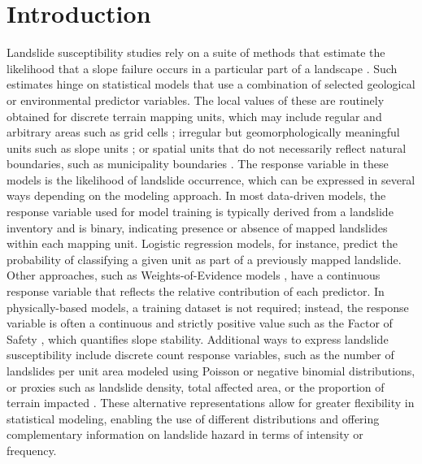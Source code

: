 \documentclass[lineno,pdflatex,sn-basic]{sn-jnl}%
\theoremstyle{thmstyleone}%
\theoremstyle{thmstyletwo}%
\theoremstyle{thmstylethree}%
\begin{document}


\maketitle

\section{Introduction}\label{intro}

Landslide susceptibility studies rely on a suite of methods that estimate the likelihood that a slope failure occurs in a particular part of a landscape \citep{brabb1984innovative, corominas2014recommendations, fell2008guidelines}. 
Such estimates hinge on statistical models that use a combination of selected geological or environmental predictor variables. 
The local values of these are routinely obtained for discrete terrain mapping units, which may include regular and arbitrary areas such as grid cells \citep{ba2018comparison}; irregular but geomorphologically meaningful units such as slope units \citep{alvioli2016automatic, bai2015landslide}; or spatial units that do not necessarily reflect natural boundaries, such as municipality boundaries \citep{reichenbach2018}.
The response variable in these models is the likelihood of landslide occurrence, which can be expressed in several ways depending on the modeling approach. 
In most data-driven models, the response variable used for model training is typically derived from a landslide inventory and is binary, indicating presence or absence of mapped landslides within each mapping unit. 
Logistic regression models, for instance, predict the probability of classifying a given unit as part of a previously mapped landslide. 
Other approaches, such as Weights-of-Evidence models \citep{bonham1989integration}, have a continuous response variable that reflects the relative contribution of each predictor. 
In physically-based models, a training dataset is not required; instead, the response variable is often a continuous and strictly positive value such as the Factor of Safety \citep{durmaz2023comparison}, which quantifies slope stability. 
Additional ways to express landslide susceptibility include discrete count response variables, such as the number of landslides per unit area modeled using Poisson or negative binomial distributions, or proxies such as landslide density, total affected area, or the proportion of terrain impacted \citep{reichenbach2018, fell2008guidelines}.
These alternative representations allow for greater flexibility in statistical modeling, enabling the use of different distributions and offering complementary information on landslide hazard in terms of intensity or frequency.
\end{document}
